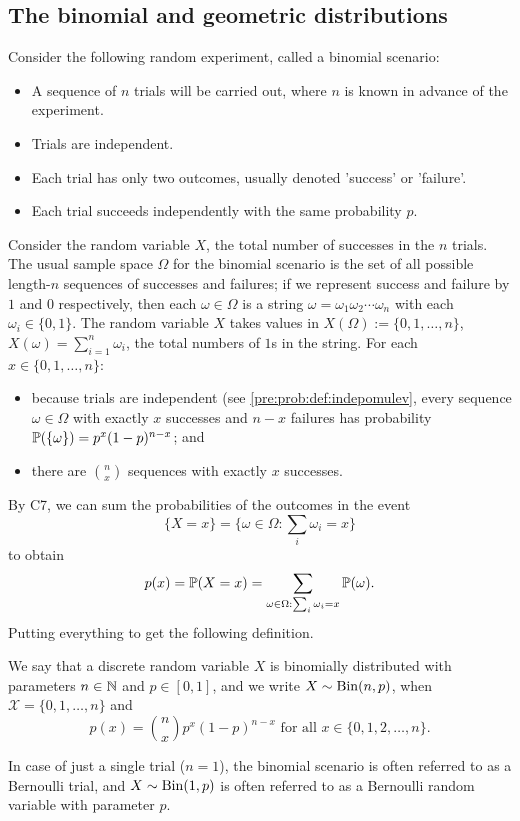 \documentclass[10pt, a4paper]{article}
\begin{document}
\subsection{The binomial and geometric distributions}
Consider the following random experiment,
called a binomial scenario:
\begin{itemize}
    \item A sequence of $n$ trials will be carried out, where $n$ is known in advance of the experiment.
    \item Trials are independent.
    \item Each trial has only two outcomes, usually denoted 'success' or 'failure'.
    \item Each trial succeeds independently with the same probability $p$.
\end{itemize}
Consider the random variable $X$, the total number of successes in the $n$ trials.
The usual sample space $\Omega$ for the binomial scenario is the set of all possible length-$n$ sequences of successes and failures; if we represent success and failure by $1$ and $0$ respectively, then each $\omega \in \Omega$ is a string 
$\omega = \omega_1 \omega_2 \dotsi \omega_n$ with each $\omega_i \in \{0, 1\}$.
The random variable $X$ takes values in $X(\Omega) := \{0, 1, \dotsc, n\}$,
$X(\omega) = \sum_{i = 1}^{n}\omega_i$, the total numbers of $1$s in the string.
For each $x \in \{0, 1, \dotsc, n\}$:
\begin{itemize}
    \item because trials are independent (see \autoref{pre:prob:def:indepomulev}, every sequence $\omega \in \Omega$ with exactly $x$ successes and $n - x$ failures has probability $\P(\{\omega\}) = p ^ x (1 - p) ^ {n - x}$; and
    \item there are $\binom{n}{x}$ sequences with exactly $x$ successes.
\end{itemize}
By C7, we can sum the probabilities of the outcomes in the event
\[
\{X = x\} = \{\omega \in \Omega : \sum_i \omega_i = x\}
\]
to obtain
\[
p(x) = \P(X = x) = \sum_{\omega \in \Omega: \sum_i \omega_i = x}\P(\omega).
\]
Putting everything to get the following definition.
\begin{definition}
    We say that a discrete random variable $X$ is binomially distributed with parameters $n \in \N$ and $p \in [0, 1]$,
    and we write $X \sim \Bin(n, p)$,
    when $\mathcal{X} = \{0, 1, \dotsc, n\}$ and
    \[
    p(x) = \binom{n}{x}p ^ x (1 - p) ^ {n - x}\text{ for all } x \in \{0, 1, 2, \dotsc, n\}.
    \]
\end{definition}
In case of just a single trial ($n = 1$),
the binomial scenario is often referred to as a Bernoulli trial,
and $X \sim \Bin(1, p)$ is often referred to as a Bernoulli random variable with parameter $p$.
\end{document}

